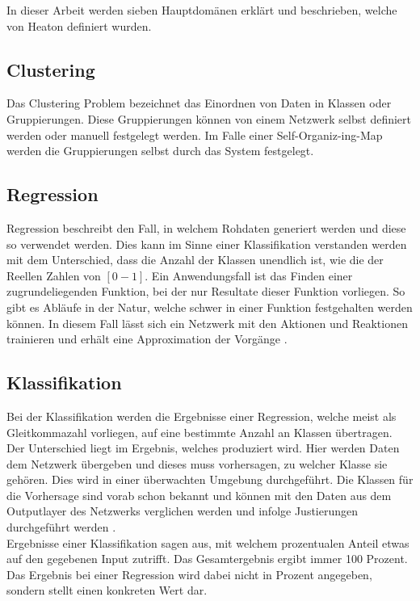 \noindent
In dieser Arbeit werden sieben Hauptdomänen erklärt und beschrieben, welche von Heaton \cite{AI3} definiert wurden. 

\subsection{Clustering}
\label{subsec:Clustering}

Das Clustering Problem bezeichnet das Einordnen von Daten in Klassen oder Gruppierungen. 
Diese Gruppierungen können von einem Netzwerk selbst definiert werden oder manuell festgelegt werden. 
Im Falle einer Self-Organiz-ing-Map werden die Gruppierungen selbst durch das System festgelegt.

\subsection{Regression}
\label{subsec:Regression}

Regression beschreibt den Fall, in welchem Rohdaten generiert werden und diese so verwendet werden. 
Dies kann im Sinne einer Klassifikation verstanden werden mit dem Unterschied, dass die Anzahl der Klassen unendlich ist, wie die der Reellen Zahlen von $[0 - 1]$. 
Ein Anwendungsfall ist das Finden einer zugrundeliegenden Funktion, bei der nur Resultate dieser Funktion vorliegen. 
So gibt es Abläufe in der Natur, welche schwer in einer Funktion festgehalten werden können. 
In diesem Fall lässt sich ein Netzwerk mit den Aktionen und Reaktionen trainieren und erhält eine Approximation der Vorgänge \cite{bishop2006pattern}.

\subsection{Klassifikation}
\label{subsec:Classification}

Bei der Klassifikation werden die Ergebnisse einer Regression, welche meist als Gleitkommazahl vorliegen, auf eine bestimmte Anzahl an Klassen übertragen. 
Der Unterschied liegt im Ergebnis, welches produziert wird.  
Hier werden Daten dem Netzwerk übergeben und dieses muss vorhersagen, zu welcher Klasse sie gehören. Dies wird in einer überwachten Umgebung durchgeführt. 
Die Klassen für die Vorhersage sind vorab schon bekannt und können mit den Daten aus dem Outputlayer des Netzwerks verglichen werden und infolge Justierungen durchgeführt werden \cite{AI3}. \\

\noindent
Ergebnisse einer Klassifikation sagen aus, mit welchem prozentualen Anteil etwas auf den gegebenen Input zutrifft. 
Das Gesamtergebnis ergibt immer 100 Prozent. 
Das Ergebnis bei einer Regression wird dabei nicht in Prozent angegeben, sondern stellt einen konkreten Wert dar.

